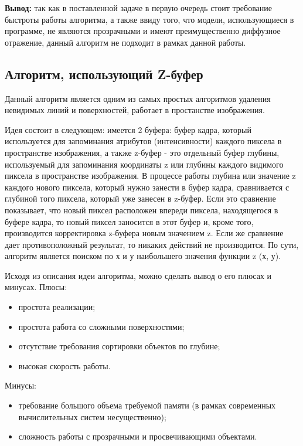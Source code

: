 \textbf{Вывод:} так как в поставленной задаче в первую очередь стоит требование быстроты работы алгоритма, а также ввиду того, что модели, использующиеся в программе, не являются прозрачными и имеют преимущественно диффузное отражение, данный алгоритм не подходит в рамках данной работы.

\subsection{Алгоритм, использующий Z-буфер}
Данный алгоритм является одним из самых простых алгоритмов удаления невидимых линий и поверхностей, работает в простанстве изображения.

Идея состоит в следующем: имеется 2 буфера: буфер кадра, который используется для запоминания атрибутов (интенсивности) каждого пиксела в пространстве изображения, а также z-буфер - это отдельный буфер глубины, используемый для запоминания координаты z или глубины каждого видимого пиксела в пространстве изображения. В процессе работы глубина или значение z каждого нового пиксела, который нужно занести в буфер кадра, сравнивается с глубиной того пиксела, который уже занесен в z-буфер. Если это сравнение показывает, что новый пиксел расположен впереди пиксела, находящегося в буфере кадра, то новый пиксел заносится в этот буфер и, кроме того, производится корректировка z-буфера новым значением z. Если же сравнение дает противоположный результат, то никаких действий не производится. По сути, алгоритм является поиском по х и у наибольшего значения функции z (х, у).

Исходя из описания идеи алгоритма, можно сделать вывод о его плюсах и минусах.
Плюсы:
\begin{itemize}
    \item простота реализации;
    \item простота работа со сложными поверхностями;
    \item отсутствие требования сортировки объектов по глубине;
    \item высокая скорость работы.
\end{itemize}

Минусы:
\begin{itemize}
    \item требование большого объема требуемой памяти (в рамках современных вычислительных систем несущественно);
    \item сложность работы с прозрачными и просвечивающими объектами.
\end{itemize}

